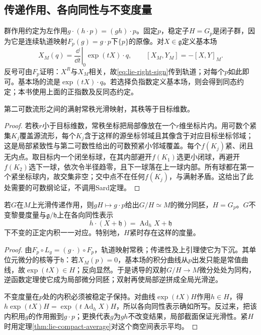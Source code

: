\subsection{传递作用、各向同性与不变度量}
群作用约定为左作用$g\cdot(h\cdot p)=(gh)\cdot p$。固定$p$，稳定子$H=G_p$是闭子群，因为它是连续轨道映射$F_p(g)=g\cdot p$下$\{p\}$的原像。对$X\in\mathfrak g$定义基本场
\begin{equation}\label{eq:lie-fundamental-sign}
 X_M(q)=\left.\frac{\dd}{\dd t}\right|_0\exp(tX)\cdot q,
 \qquad [X_M,Y_M]=-[X,Y]_M.
\end{equation}
反号可由$F_p$证明：$X^R$与$X_M$相关，故\eqref{eq:lie-right-sign}传到轨道；对每个$p$如此即可。基本场的流是$\exp(tX)\cdot q$。若选择负指数定义基本场，则会得到同态约定；本书使用上面的正指数及反同态约定。

\begin{lemma}\label{lem:lie-surjective-rank}
第二可数流形之间的满射常秩光滑映射，其秩等于目标维数。
\end{lemma}
\begin{proof}
若秩$r$小于目标维数，常秩坐标把局部像放在一个$r$维坐标片内。用可数个紧集$K_j$覆盖源流形，每个$K_j$含于这样的源坐标邻域且其像含于对应目标坐标邻域；这是局部紧致性与第二可数性给出的可数预紧小邻域覆盖。每个$f(K_j)$紧、闭且无内点。取目标内一个闭坐标球，在其内部避开$f(K_1)$选更小闭球，再避开$f(K_2)$选下一球，依次令半径趋零，且下一球落在上一球内部。所有球都在第一个紧坐标球内，故交集非空；交中点不在任何$f(K_j)$，与满射矛盾。这给出了此处需要的可数纲论证，不调用Sard定理。
\end{proof}

\begin{theorem}\label{thm:lie-homogeneous}
若$G$在$M$上光滑传递作用，则$gH\mapsto g\cdot p$给出$G/H\simeq M$的微分同胚，$H=G_p$。$G$不变黎曼度量与$\mathfrak g/\mathfrak h$上在各向同性表示
\[
 h\cdot(X+\mathfrak h)=\operatorname{Ad}_hX+\mathfrak h
\]
下不变的正定内积一一对应。特别地，$H$紧时存在这样的度量。
\end{theorem}
\begin{proof}
由$F_p\circ L_g=(g\cdot)\circ F_p$，轨道映射常秩；传递性及上引理使它为下沉。其单位元微分的核等于$\mathfrak h$：若$X_M(p)=0$，基本场的积分曲线从$p$出发只能是常值曲线，故$\exp(tX)\in H$；反向显然。于是诱导的双射$G/H\to M$微分处处为同构，逆函数定理使它成为局部微分同胚；双射再使局部逆拼成全局光滑逆。

不变度量在$p$处的内积必须被稳定子保持。对曲线$\exp(tX)H$作用$h\in H$，得$h\exp(tX)H=\exp(t\operatorname{Ad}_hX)H$，所以各向同性表示确如所写。反过来，把该内积用$g$的作用搬到$g\cdot p$；更换代表$g$为$gh$不改变结果，局部截面保证光滑性。紧$H$时用定理\ref{thm:lie-compact-average}对这个商空间表示平均。
\end{proof}

